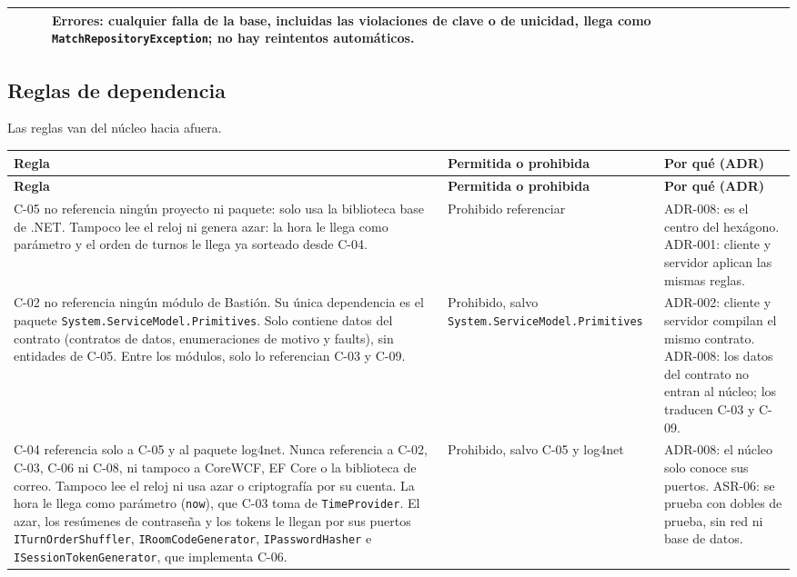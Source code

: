 \documentclass[11pt,letterpaper]{article}
\newcommand{\hd}[1]{\textbf{\small #1}}
\newcommand{\headrow}{\rowcolor{SADHead}}
\begin{document}
\begin{xltabular}{\linewidth}{|>{\small\raggedright\arraybackslash}p{3cm}|>{\small\raggedright\arraybackslash}p{1.8cm}|>{\small\raggedright\arraybackslash}p{2.8cm}|Y|}
    & & & \textbf{Errores:} cualquier falla de la base, incluidas las violaciones de clave o de unicidad, llega como \texttt{MatchRepository\allowbreak Exception}; no hay reintentos automáticos.\\\hline
\end{xltabular}

\subsection{Reglas de dependencia}
Las reglas van del núcleo hacia afuera.
\begin{xltabular}{\linewidth}{|Y|>{\small\raggedright\arraybackslash}p{2.9cm}|>{\small\raggedright\arraybackslash}p{4.4cm}|}\hline
  \headrow\hd{Regla} & \hd{Permitida o prohibida} & \hd{Por qué (ADR)}\\\hline
  \endfirsthead
  \headrow\hd{Regla} & \hd{Permitida o prohibida} & \hd{Por qué (ADR)}\\\hline
  \endhead
  C-05 no referencia ningún proyecto ni paquete: solo usa la biblioteca base de .NET. Tampoco lee el reloj ni genera azar: la hora le llega como parámetro y el orden de turnos le llega ya sorteado desde C-04. & Prohibido referenciar & ADR-008: es el centro del hexágono. ADR-001: cliente y servidor aplican las mismas reglas.\\\hline
  C-02 no referencia ningún módulo de Bastión. Su única dependencia es el paquete \texttt{System.\allowbreak ServiceModel.\allowbreak Primitives}. Solo contiene datos del contrato (contratos de datos, enumeraciones de motivo y faults), sin entidades de C-05. Entre los módulos, solo lo referencian C-03 y C-09. & Prohibido, salvo \texttt{System.\allowbreak ServiceModel.\allowbreak Primitives} & ADR-002: cliente y servidor compilan el mismo contrato. ADR-008: los datos del contrato no entran al núcleo; los traducen C-03 y C-09.\\\hline
  C-04 referencia solo a C-05 y al paquete log4net. Nunca referencia a C-02, C-03, C-06 ni C-08, ni tampoco a CoreWCF, EF Core o la biblioteca de correo. Tampoco lee el reloj ni usa azar o criptografía por su cuenta. La hora le llega como parámetro (\texttt{now}), que C-03 toma de \texttt{TimeProvider}. El azar, los resúmenes de contraseña y los tokens le llegan por sus puertos \texttt{ITurnOrder\allowbreak Shuffler}, \texttt{IRoomCode\allowbreak Generator}, \texttt{IPassword\allowbreak Hasher} e \texttt{ISession\allowbreak Token\allowbreak Generator}, que implementa C-06. & Prohibido, salvo C-05 y log4net & ADR-008: el núcleo solo conoce sus puertos. ASR-06: se prueba con dobles de prueba, sin red ni base de datos.\\\hline

\end{xltabular}
\end{document}

